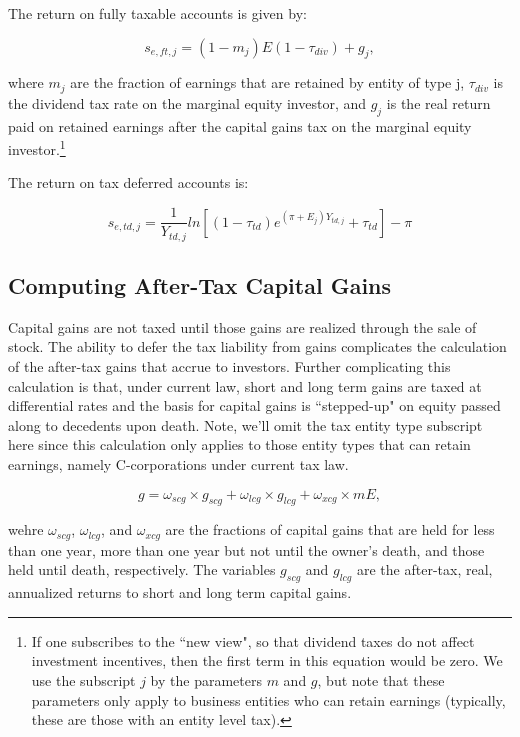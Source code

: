 \documentclass[article,11pt,letterpaper,fleqn]{article}
\theoremstyle{definition}
\numberwithin{equation}{section}
\begin{document}
The return on fully taxable accounts is given by:

\begin{equation}
s_{e,ft,j} = (1-m_{j})E(1-\tau_{div}) + g_{j},
\end{equation}

\noindent\noindent where $m_{j}$ are the fraction of earnings that are retained by entity of type j, $\tau_{div}$ is the dividend tax rate on the marginal equity investor, and $g_{j}$ is the real return paid on retained earnings after the capital gains tax on the marginal equity investor.\footnote{If one subscribes to the ``new view", so that dividend taxes do not affect investment incentives, then the first term in this equation would be zero.  We use the subscript $j$ by the parameters $m$ and $g$, but note that these parameters only apply to business entities who can retain earnings (typically, these are those with an entity level tax).}
 
 The return on tax deferred accounts is:
 
 \begin{equation}
s_{e,td,j} = \frac{1}{Y_{td,j}}ln \left[(1-\tau_{td})e^{(\pi+E_{j})Y_{td,j}}+\tau_{td}\right]-\pi
\end{equation}
 

\subsection{Computing After-Tax Capital Gains}

Capital gains are not taxed until those gains are realized through the sale of stock.  The ability to defer the tax liability from gains complicates the calculation of the after-tax gains that accrue to investors. Further complicating this calculation is that, under current law, short and long term gains are taxed at differential rates and the basis for capital gains is ``stepped-up" on equity passed along to decedents upon death.  Note, we'll omit the tax entity type subscript here since this calculation only applies to those entity types that can retain earnings, namely C-corporations under current tax law. 

\begin{equation}
g = \omega_{scg}\times g_{scg} + \omega_{lcg}\times g_{lcg} + \omega_{xcg}\times mE,
\end{equation}
 
 \noindent\noindent wehre $\omega_{scg}$, $\omega_{lcg}$, and $\omega_{xcg}$ are the fractions of capital gains that are held for less than one year, more than one year but not until the owner's death, and those held until death, respectively.  The variables $g_{scg}$ and $g_{lcg}$ are the after-tax, real, annualized returns to short and long term capital gains.
 
\end{document}
